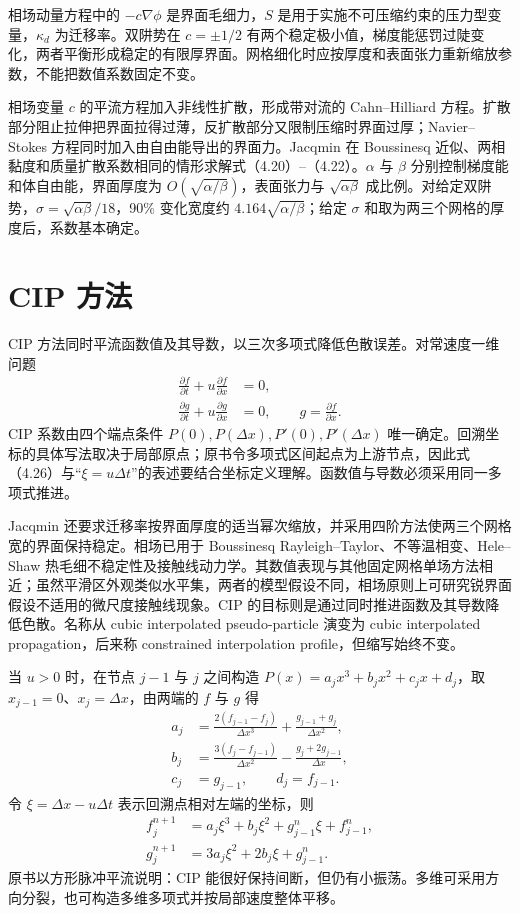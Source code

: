 \documentclass[11pt,a4paper,openany,fontset=none]{ctexbook}
\begin{document}
相场动量方程中的 $-c\nabla\phi$ 是界面毛细力，$S$ 是用于实施不可压缩约束的压力型变量，$\kappa_d$ 为迁移率。双阱势在 $c=\pm1/2$ 有两个稳定极小值，梯度能惩罚过陡变化，两者平衡形成稳定的有限厚界面。网格细化时应按厚度和表面张力重新缩放参数，不能把数值系数固定不变。

相场变量 $c$ 的平流方程加入非线性扩散，形成带对流的 Cahn--Hilliard 方程。扩散部分阻止拉伸把界面拉得过薄，反扩散部分又限制压缩时界面过厚；Navier--Stokes 方程同时加入由自由能导出的界面力。Jacqmin 在 Boussinesq 近似、两相黏度和质量扩散系数相同的情形求解式（4.20）--（4.22）。$\alpha$ 与 $\beta$ 分别控制梯度能和体自由能，界面厚度为 $O(\sqrt{\alpha/\beta})$，表面张力与 $\sqrt{\alpha\beta}$ 成比例。对给定双阱势，$\sigma=\sqrt{\alpha\beta}/18$，90\% 变化宽度约 $4.164\sqrt{\alpha/\beta}$；给定 $\sigma$ 和取为两三个网格的厚度后，系数基本确定。

\section{CIP 方法}

CIP 方法同时平流函数值及其导数，以三次多项式降低色散误差。对常速度一维问题
\begin{align}
\frac{\partial f}{\partial t}+u\frac{\partial f}{\partial x}&=0,
\tag{4.23}\\
\frac{\partial g}{\partial t}+u\frac{\partial g}{\partial x}&=0,
\qquad g=\frac{\partial f}{\partial x}.
\tag{4.24}
\end{align}
CIP 系数由四个端点条件 $P(0),P(\Delta x),P'(0),P'(\Delta x)$ 唯一确定。回溯坐标的具体写法取决于局部原点；原书令多项式区间起点为上游节点，因此式（4.26）与“$\xi=u\Delta t$”的表述要结合坐标定义理解。函数值与导数必须采用同一多项式推进。

Jacqmin 还要求迁移率按界面厚度的适当幂次缩放，并采用四阶方法使两三个网格宽的界面保持稳定。相场已用于 Boussinesq Rayleigh--Taylor、不等温相变、Hele--Shaw 热毛细不稳定性及接触线动力学。其数值表现与其他固定网格单场方法相近；虽然平滑区外观类似水平集，两者的模型假设不同，相场原则上可研究锐界面假设不适用的微尺度接触线现象。CIP 的目标则是通过同时推进函数及其导数降低色散。名称从 cubic interpolated pseudo-particle 演变为 cubic interpolated propagation，后来称 constrained interpolation profile，但缩写始终不变。

当 $u>0$ 时，在节点 $j-1$ 与 $j$ 之间构造 $P(x)=a_jx^3+b_jx^2+c_jx+d_j$，取 $x_{j-1}=0$、$x_j=\Delta x$，由两端的 $f$ 与 $g$ 得
\begin{align}
a_j&=\frac{2(f_{j-1}-f_j)}{\Delta x^3}+\frac{g_{j-1}+g_j}{\Delta x^2},\\
b_j&=\frac{3(f_j-f_{j-1})}{\Delta x^2}-\frac{g_j+2g_{j-1}}{\Delta x},\\
c_j&=g_{j-1},\qquad d_j=f_{j-1}.
\tag{4.25}
\end{align}
令 $\xi=\Delta x-u\Delta t$ 表示回溯点相对左端的坐标，则
\begin{align}
f_j^{n+1}&=a_j\xi^3+b_j\xi^2+g_{j-1}^n\xi+f_{j-1}^n,\\
g_j^{n+1}&=3a_j\xi^2+2b_j\xi+g_{j-1}^n.
\tag{4.26}
\end{align}
原书以方形脉冲平流说明：CIP 能很好保持间断，但仍有小振荡。多维可采用方向分裂，也可构造多维多项式并按局部速度整体平移。
\end{document}
